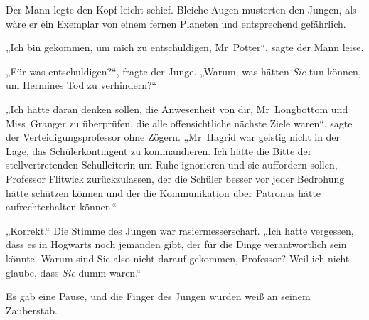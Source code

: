 Der Mann legte den Kopf leicht schief. Bleiche Augen musterten den Jungen, als wäre er ein Exemplar von einem fernen Planeten und entsprechend gefährlich.

„Ich bin gekommen, um mich zu entschuldigen, Mr~Potter“, sagte der Mann leise.

„Für was entschuldigen?“, fragte der Junge.
„Warum, was hätten \emph{Sie} tun können, um Hermines Tod zu verhindern?“

„Ich hätte daran denken sollen, die Anwesenheit von dir, Mr~Longbottom und Miss~Granger zu überprüfen, die alle offensichtliche nächste Ziele waren“, sagte der Verteidigungsprofessor ohne Zögern.
„Mr~Hagrid war geistig nicht in der Lage, das Schülerkontingent zu kommandieren. Ich hätte die Bitte der stellvertretenden Schulleiterin um Ruhe ignorieren und sie auffordern sollen, Professor Flitwick zurückzulassen, der die Schüler besser vor jeder Bedrohung hätte schützen können und der die Kommunikation über Patronus hätte aufrechterhalten können.“

„Korrekt.“ Die Stimme des Jungen war rasiermesserscharf.
„Ich hatte vergessen, dass es in Hogwarts noch jemanden gibt, der für die Dinge verantwortlich sein könnte. Warum sind Sie also nicht darauf gekommen, Professor? Weil ich nicht glaube, dass \emph{Sie} dumm waren.“

Es gab eine Pause, und die Finger des Jungen wurden weiß an seinem Zauberstab.

